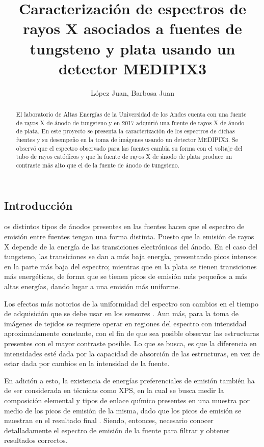 \documentclass{sciposter}
\title{Caracterización de espectros de rayos X asociados a fuentes de tungsteno y plata usando un detector MEDIPIX3}
\author{López Juan, Barbosa Juan}
\institute 
{Departamento de Física\\
Universidad de los Andes\\
Cra 1 N$^\circ$ 18A - 12 Bogotá, Colombia}
\begin{document}
\maketitle

\begin{multicols}{3}

\begin{abstract}
	El laboratorio de Altas Energías de la Universidad de los Andes cuenta con una fuente de rayos X de ánodo de tungsteno y en 2017 adquirió una fuente de rayos X de ánodo de plata. En este proyecto se presenta la caracterización de los espectros de dichas fuentes y su desempeño en la toma de imágenes usando un detector MEDIPIX3. Se observó que el espectro observado para las fuentes cambia su forma con el voltaje del tubo de rayos catódicos y que la fuente de rayos X de ánodo de plata produce un contraste más alto que el de la fuente de ánodo de tungsteno.
\end{abstract}

\section{Introducción}
	os distintos tipos de ánodos presentes en las fuentes hacen que el espectro de emisión entre fuentes tengan una forma distinta. Puesto que la emisión de rayos X depende de la energía de las transiciones electrónicas del ánodo. En el caso del tungsteno, las transiciones se dan a más baja energía, presentando picos intensos en la parte más baja del espectro; mientras que en la plata se tienen transiciones más energéticas, de forma que se tienen picos de emisión más pequeños a más altas energías, dando lugar a una emisión más uniforme.
	
	Los efectos más notorios de la uniformidad del espectro son cambios en el tiempo de adquisición que se debe usar en los sensores \cite{range}. Aun más, para la toma de imágenes de tejidos se requiere operar en regiones del espectro con intensidad aproximadamente constante, con el fin de que sea posible observar las estructuras presentes con el mayor contraste posible. Lo que se busca, es que la diferencia en intensidades esté dada por la capacidad de absorción de las estructuras, en vez de estar dada por cambios en la intensidad de la fuente.
	
	En adición a esto, la existencia de energías preferenciales de emisión también ha de ser considerada en técnicas como XPS, en la cual se busca medir la composición elemental y tipos de enlace químico presentes en una muestra por medio de los picos de emisión de la misma, dado que los picos de emisión se muestran en el resultado final \cite{xps}. Siendo, entonces, necesario conocer detalladamente el espectro de emisión de la fuente para filtrar y obtener resultados correctos.


\end{multicols}
\end{document}
